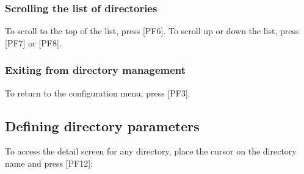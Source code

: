 \documentclass[letterpaper,10pt,english]{sphinxmanual}
\begin{document}
\subsubsection{Scrolling the list of directories}
\label{\detokenize{User_Guide:scrolling-the-list-of-directories}}
To scroll to the top of the list, press {[}PF6{]}. To scroll up or down the list, press {[}PF7{]} or {[}PF8{]}.


\subsubsection{Exiting from directory management}
\label{\detokenize{User_Guide:exiting-from-directory-management}}
To return to the configuration menu, press {[}PF3{]}.


\subsection{Defining directory parameters}
\label{\detokenize{User_Guide:defining-directory-parameters}}
To access the detail screen for any directory, place the cursor on the directory name and press {[}PF12{]}:
\end{document}

